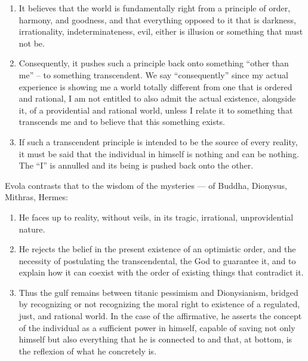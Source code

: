\begin{enumerate}


\item It believes that the world is fundamentally right from a principle of order, harmony, and goodness, and that everything opposed to it that is darkness, irrationality, indeterminateness, evil, either is illusion or something that must not be.

\item Consequently, it pushes such a principle back onto something ``other than me'' -- to something transcendent. We say ``consequently'' since my actual experience is showing me a world totally different from one that is ordered and rational, I am not entitled to also admit the actual existence, alongside it, of a providential and rational world, unless I relate it to something that transcends me and to believe that this something exists.

\item If such a transcendent principle is intended to be the source of every reality, it must be said that the individual in himself is nothing and can be nothing. The ``I'' is annulled and its being is pushed back onto the other.
\end{enumerate}


Evola contrasts that to the wisdom of the mysteries --- of Buddha, Dionysus, Mithras, Hermes:

\begin{enumerate}


\item He faces up to reality, without veils, in its tragic, irrational, unprovidential nature.

\item He rejects the belief in the present existence of an optimistic order, and the necessity of postulating the transcendental, the God to guarantee it, and to explain how it can coexist with the order of existing things that contradict it.

\item Thus the gulf remains between titanic pessimism and Dionysianism, bridged by recognizing or not recognizing the moral right to existence of a regulated, just, and rational world. In the case of the affirmative, he asserts the concept of the individual as a sufficient power in himself, capable of saving not only himself but also everything that he is connected to and that, at bottom, is the reflexion of what he concretely is.
\end{enumerate}


